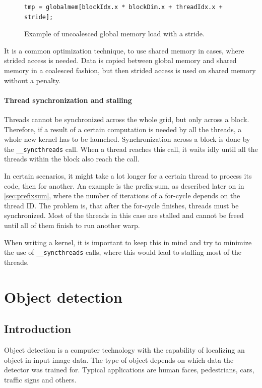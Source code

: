 \begin{figure}[h]
\begin{verbatim}
tmp = globalmem[blockIdx.x * blockDim.x + threadIdx.x + stride];
\end{verbatim}
\caption{Example of uncoalesced global memory load with a stride.}\label{code:uncoalesced}
\end{figure}

It is a common optimization technique, to use shared memory in cases, where strided access is needed. Data is copied between global memory and shared memory in a coalesced fashion, but then strided access is used on shared memory without a penalty.

\subsubsection{Thread synchronization and stalling}

Threads cannot be synchronized across the whole grid, but only across a block. Therefore, if a result of a certain computation is needed by all the threads, a whole new kernel has to be launched. Synchronization across a block is done by the \verb|__syncthreads| call. When a thread reaches this call, it waits idly until all the threads within the block also reach the call.

In certain scenarios, it might take a lot longer for a certain thread to process its code, then for another. An example is the prefix-sum, as described later on in \ref{sec:prefixsum}, where the number of iterations of a for-cycle depends on the thread ID. The problem is, that after the for-cycle finishes, threads must be synchronized. Most of the threads in this case are stalled and cannot be freed until all of them finish to run another warp.

When writing a kernel, it is important to keep this in mind and try to minimize the use of \verb|__syncthreads| calls, where this would lead to stalling most of the threads.

\chapter{Object detection}

\section{Introduction}

Object detection is a computer technology with the capability of localizing an object in input image data. The type of object depends on which data the detector was trained for. Typical applications are human faces, pedestrians, cars, traffic signs and others.

